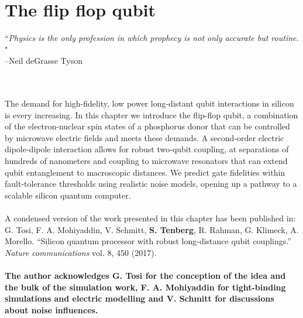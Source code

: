 
\chapter{The flip flop qubit} %

\label{Chapter2}

\noindent\hrulefill
\vspace{0.5cm} %
\begin{flushright}
        ``\emph{Physics is the only profession in which prophecy is not only accurate but routine. }"
\\ 
--Neil deGrasse Tyson \\
\end{flushright}

\vspace{0.5cm}


\noindent\hrulefill
\vspace{0.5cm} %
\\
\hangindent=4cm
\\
The demand for high-fidelity, low power long-distant qubit interactions in silicon is every increasing. In this chapter we introduce the flip-flop qubit, a combination of the electron-nuclear spin states of a phosphorus donor that can be controlled by microwave electric fields and meets these demands. A second-order electric dipole-dipole interaction allows for robust two-qubit coupling, at separations of hundreds of nanometers and coupling to microwave resonators that can extend qubit entanglement to macroscopic distances. We predict gate fidelities within fault-tolerance thresholds using realistic noise models, opening up a pathway to a scalable silicon quantum computer. 
\\ \\
\scriptsize
\hangindent=4cm
A condensed version of the work presented in this chapter has been published in:\\
G. Tosi, F. A. Mohiyaddin, V. Schmitt, \textbf{S. Tenberg}, R. Rahman,
G. Klimeck, A. Morello. ``Silicon quantum processor with robust long-distance qubit couplings.'' \textit{Nature communications} vol. 8, 450 (2017).\\
\\
\footnotesize
\hangindent=4cm
\textbf{The author acknowledges G. Tosi for the conception of the idea and the bulk of the simulation work, F. A. Mohiyaddin for tight-binding simulations and electric modelling and V. Schmitt for discussions about noise influences.}\\

